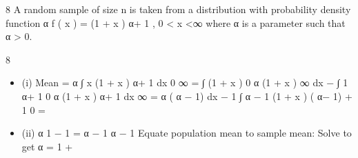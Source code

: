 \documentclass[a4paper,12pt]{article}
\begin{document}
8
A random sample of size n is taken from a distribution with probability density
function
α
f ( x ) =
(1 + x ) α+ 1
,
0 < x <∞
where α is a parameter such that α > 0.

8
\begin{itemize}
\item (i)
Mean =
α
∫ x (1 + x ) α+ 1 dx
0
∞
=
∫ (1 + x )
0
α
(1 + x )
∞
dx − ∫ 1
α+ 1
0
α
(1 + x ) α+ 1
dx
∞
=
α
( α − 1)
dx − 1
∫
α − 1 (1 + x ) ( α− 1) + 1
0
=
\item (ii)
α
1
− 1 =
α − 1
α − 1
Equate population mean to sample mean:
Solve to get α = 1 +
\end{itemize}
\newpage
\end{document}
